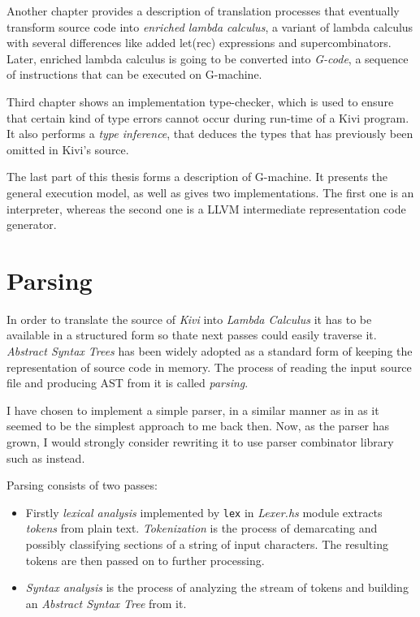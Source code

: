 \documentclass[12pt,a4paper]{report}
\begin{document}
Another chapter provides a description of translation processes that eventually
transform source code into \textit{enriched lambda calculus}, a variant of
lambda calculus with several differences like added let(rec) expressions and
supercombinators. Later, enriched lambda calculus is going to be converted
into \textit{G-code}, a sequence of instructions that can be executed on
G-machine.

Third chapter shows an implementation type-checker, which is used to ensure
that certain kind of type errors cannot occur during run-time of a Kivi
program. It also performs a \textit{type inference}, that deduces the types
that has previously been omitted in Kivi's source.

The last part of this thesis forms a description of G-machine. It presents the
general execution model, as well as gives two implementations. The first one is
an interpreter, whereas the second one is a LLVM intermediate representation
code generator.

\chapter{Parsing}

In order to translate the source of \textit{Kivi} into \textit{Lambda Calculus}
it has to be available in a structured form so thate next passes could easily
traverse it. \textit{Abstract Syntax Trees}\cite{wiki:ast} has been widely
adopted as a standard form of keeping the representation of source code in
memory. The process of reading the input source file and producing AST from it
is called \textit{parsing}.

I have chosen to implement a simple parser, in a similar manner as in
\cite{JonLes00} as it seemed to be the simplest approach to me back then. Now, as
the parser has grown, I would strongly consider rewriting it to use parser
combinator library such as \cite{website:parsec} instead.

Parsing consists of two passes:

\begin{itemize}
  \item Firstly \textit{lexical analysis} implemented by \texttt{lex} in
    \textit{Lexer.hs} module extracts \textit{tokens} from plain text.
    \textit{Tokenization} is the process of demarcating and possibly
    classifying sections of a string of input characters. The resulting tokens
    are then passed on to further processing.
  \item \textit{Syntax analysis} is the process of analyzing the stream of
    tokens and building an \textit{Abstract Syntax Tree} from it.
\end{itemize}
\end{document}
